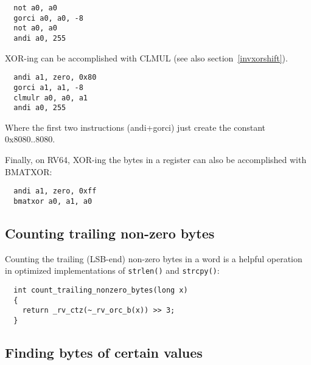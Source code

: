 \begin{minipage}{\linewidth}
\begin{verbatim}
  not a0, a0
  gorci a0, a0, -8
  not a0, a0
  andi a0, 255
\end{verbatim}
\end{minipage}

XOR-ing can be accomplished with CLMUL (see also section~\ref{invxorshift}).

\begin{minipage}{\linewidth}
\begin{verbatim}
  andi a1, zero, 0x80
  gorci a1, a1, -8
  clmulr a0, a0, a1
  andi a0, 255
\end{verbatim}
\end{minipage}

Where the first two instructions (andi+gorci) just create the constant 0x8080..8080.

Finally, on RV64, XOR-ing the bytes in a register can also be accomplished with BMATXOR:

\begin{minipage}{\linewidth}
\begin{verbatim}
  andi a1, zero, 0xff
  bmatxor a0, a1, a0
\end{verbatim}
\end{minipage}


\subsection{Counting trailing non-zero bytes}

Counting the trailing (LSB-end) non-zero bytes in a word
is a helpful operation in optimized implementations of {\tt strlen()}
and {\tt strcpy()}:

\begin{minipage}{\linewidth}
\begin{verbatim}
  int count_trailing_nonzero_bytes(long x)
  {
    return _rv_ctz(~_rv_orc_b(x)) >> 3;
  }
\end{verbatim}
\end{minipage}


\subsection{Finding bytes of certain values}


